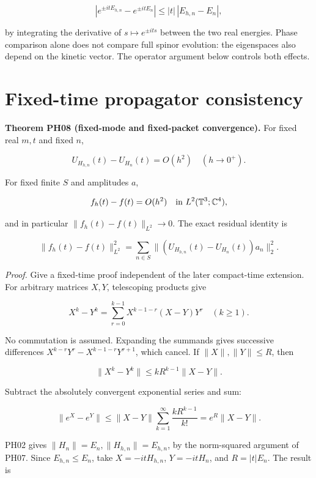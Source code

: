 \[
|e^{\pm itE_{h,n}}-e^{\pm itE_n}|
\le |t|\,|E_{h,n}-E_n|,
\]

by integrating the derivative of \(s\mapsto e^{\pm its}\) between the
two real energies. Phase comparison alone does not compare full spinor
evolution: the eigenspaces also depend on the kinetic vector. The
operator argument below controls both effects.


\hypertarget{fixed-time-propagator-consistency}{%
\section{Fixed-time propagator
consistency}\label{fixed-time-propagator-consistency}}

\textbf{Theorem PH08 (fixed-mode and fixed-packet convergence).} For
fixed real \(m,t\) and fixed \(n\),

\[
U_{H_{h,n}}(t)-U_{H_n}(t)=O(h^2)\quad(h\to0^+).
\]

For fixed finite \(S\) and amplitudes \(a\),

\[
f_h(t)-f(t)=O(h^2)
\quad\hbox{in }L^2(\mathbb T^3;\mathbb C^4),
\]

and in particular \(\|f_h(t)-f(t)\|_{L^2}\to0\). The exact residual
identity is

\[
\|f_h(t)-f(t)\|_{L^2}^2
=\sum_{n\in S}\|(U_{H_{h,n}}(t)-U_{H_n}(t))a_n\|_2^2.
\]

\emph{Proof.} Give a fixed-time proof independent of the later
compact-time extension. For arbitrary matrices \(X,Y\), telescoping
products give

\[
X^k-Y^k=\sum_{r=0}^{k-1}X^{k-1-r}(X-Y)Y^r
\quad(k\ge1).
\]

No commutation is assumed. Expanding the summands gives successive
differences \(X^{k-r}Y^r-X^{k-1-r}Y^{r+1}\), which cancel. If
\(\|X\|,\|Y\|\le R\), then

\[
\|X^k-Y^k\|\le kR^{k-1}\|X-Y\|.
\]

Subtract the absolutely convergent exponential series and sum:

\[
\|e^X-e^Y\|
\le\|X-Y\|\sum_{k=1}^{\infty}\frac{kR^{k-1}}{k!}
=e^R\|X-Y\|.
\]

PH02 gives \(\|H_n\|=E_n,\|H_{h,n}\|=E_{h,n}\), by the norm-squared
argument of PH07. Since \(E_{h,n}\le E_n\), take \(X=-itH_{h,n}\),
\(Y=-itH_n\), and \(R=|t|E_n\). The result is


